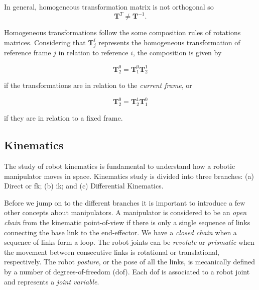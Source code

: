 In general, homogeneous transformation matrix is not orthogonal so 
\begin{equation}
    \boldsymbol{T}^{T} \neq \boldsymbol{T}^{-1}.
\end{equation}

Homogeneous transformations follow the some composition rules of rotations matrices. Considering that $\boldsymbol{T}^{i}_{j}$ represents the homogeneous transformation of reference frame $j$ in relation to reference $i$, the composition is given by

\begin{equation}
    \boldsymbol{T}^{0}_{2} = \boldsymbol{T}^{0}_{1}\boldsymbol{T}^{1}_{2}
\end{equation}

if the transformations are in relation to the \emph{current frame}, or

\begin{equation}
    \boldsymbol{T}^{0}_{2} = \boldsymbol{T}^{1}_{2}\boldsymbol{T}^{0}_{1}
\end{equation}

if they are in relation to a fixed frame.



\subsection{Kinematics}
\label{subsec:kinematics}

The study of robot kinematics is fundamental to understand how a robotic manipulator moves in space. Kinematics study is divided into three branches: (a) Direct or \gls{fk}; (b) \gls{ik}; and (c) Differential Kinematics.\bigskip

Before we jump on to the different branches it is important to introduce a few other concepts about manipulators. A manipulator is considered to be an \emph{open chain} from the kinematic point-of-view if there is only a single sequence of links connecting the base link to the end-effector. We have a \emph{closed chain} when a sequence of links form a loop. The robot joints can be \emph{revolute} or \emph{prismatic} when the movement between consecutive links is rotational or translational, respectively. The robot \emph{posture}, or the pose of all the links, is mecanically defined by a number of degrees-of-freedom (\gls{dof}). Each \gls{dof} is associated to a robot joint and represents a \emph{joint variable}.

